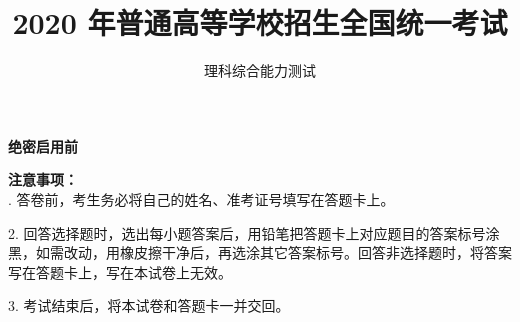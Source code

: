 \documentclass[list,mac]{BHCexam}
\begin{document}
\textbf{绝密启用前} 
\title{2020 年普通高等学校招生全国统一考试}
\subtitle{理科综合能力测试}
\maketitle
\textbf{注意事项：} \\
. 答卷前，考生务必将自己的姓名、准考证号填写在答题卡上。

2. 回答选择题时，选出每小题答案后，用铅笔把答题卡上对应题目的答案标号涂黑，如需改动，用橡皮擦干净后，再选涂其它答案标号。回答非选择题时，将答案写在答题卡上，写在本试卷上无效。

3. 考试结束后，将本试卷和答题卡一并交回。

\begin{groups}


\begin{questions}[30s]

\end{questions}


\begin{questions}[p]

\end{questions}



\end{groups}
\label{lastpage}
\end{document}
